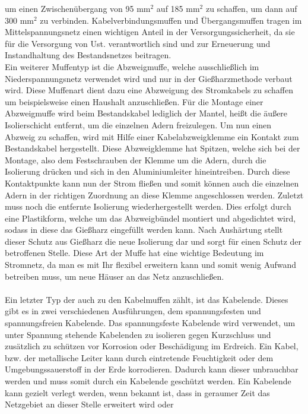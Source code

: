 um einen Zwischenübergang von 95 mm$^2$ auf 185 mm$^2$ zu schaffen, um dann auf 300 mm$^2$ zu verbinden. Kabelverbindungsmuffen und Übergangsmuffen tragen im 
Mittelspannungsnetz einen wichtigen Anteil in der Versorgungssicherheit, da sie für die Versorgung von Ust. verantwortlich sind und zur Erneuerung und 
Instandhaltung des Bestandsnetzes beitragen. \autocite{Cellpack}
\\
Ein weiterer Muffentyp ist die Abzweigmuffe, welche ausschließlich im Niederspannungsnetz verwendet wird und nur in der Gießharzmethode verbaut wird. Diese 
Muffenart dient dazu eine Abzweigung des Stromkabels zu schaffen um beispielsweise einen Haushalt anzuschließen. Für die Montage einer Abzweigmuffe wird beim 
Bestandskabel lediglich der Mantel, heißt die äußere Isolierschicht entfernt, um die einzelnen Adern freizulegen. Um nun einen Abzweig zu schaffen, wird mit 
Hilfe einer Kabelabzweigklemme ein Kontakt zum Bestandskabel hergestellt. Diese Abzweigklemme hat Spitzen, welche sich bei der Montage, also dem Festschrauben 
der Klemme um die Adern, durch die Isolierung drücken und sich in den Aluminiumleiter hineintreiben. Durch diese Kontaktpunkte kann nun der Strom fließen und 
somit können auch die einzelnen Adern in der richtigen Zuordnung an diese Klemme angeschlossen werden. Zuletzt muss noch die entfernte Isolierung 
wiederhergestellt werden. Dies erfolgt durch eine Plastikform, welche um das Abzweigbündel montiert und abgedichtet wird, sodass in diese das Gießharz 
eingefüllt werden kann. Nach Aushärtung stellt dieser Schutz aus Gießharz die neue Isolierung dar und sorgt für einen Schutz der betroffenen Stelle. Diese 
Art der Muffe hat eine wichtige Bedeutung im Stromnetz, da man es mit Ihr flexibel erweitern kann und somit wenig Aufwand betreiben muss, um \zB neue Häuser 
an das Netz anzuschließen. \autocite{Cellpack}
\\\\
Ein letzter Typ der auch zu den Kabelmuffen zählt, ist das Kabelende. Dieses gibt es in zwei verschiedenen Ausführungen, dem spannungsfesten und 
spannungsfreien Kabelende. Das spannungsfeste Kabelende wird verwendet, um unter Spannung stehende Kabelenden zu isolieren gegen Kurzschluss und zusätzlich 
zu schützen vor Korrosion oder Beschädigung im Erdreich. Ein Kabel, bzw. der metallische Leiter kann durch eintretende Feuchtigkeit oder dem 
Umgebungssauerstoff in der Erde korrodieren. Dadurch kann dieser unbrauchbar werden und muss somit durch ein Kabelende 
geschützt werden. Ein Kabelende kann gezielt verlegt werden, wenn \zB bekannt ist, dass in geraumer Zeit das Netzgebiet an dieser Stelle erweitert wird oder 
